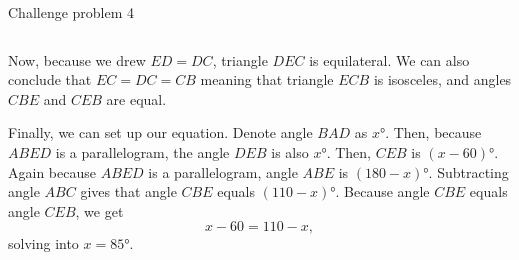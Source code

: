 \documentclass[9pt,aspectratio=169]{beamer}
\begin{document}
\begin{frame}{Challenge problem 4}
\begin{columns}[T]
\begin{column}{0.5\textwidth}
Now, because we drew $ED = DC$, triangle $DEC$ is equilateral. We can also conclude that $EC=DC=CB$ meaning that triangle $ECB$ is isosceles, and angles $CBE$ and $CEB$ are equal.

Finally, we can set up our equation. Denote angle $BAD$ as $x°$. Then, because $ABED$ is a parallelogram, the angle $DEB$ is also $x°$. Then, $CEB$ is $(x-60)°$. Again because $ABED$ is a parallelogram, angle $ABE$ is $(180-x)°$. Subtracting angle $ABC$ gives that angle $CBE$ equals $(110-x)°$. Because angle $CBE$ equals angle $CEB$, we get\[x-60=110-x,\] solving into $x=\boxed{85°}$.
    \end{column}
  \end{columns}
\end{frame}

\end{document}

